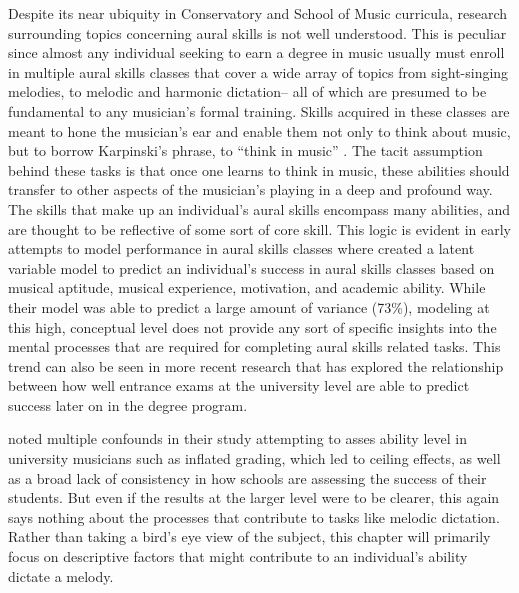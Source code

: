 \documentclass[12pt,]{book}
\begin{document}
Despite its near ubiquity in Conservatory and School of Music curricula, research surrounding topics concerning aural skills is not well understood.
This is peculiar since almost any individual seeking to earn a degree in music usually must enroll in multiple aural skills classes that cover a wide array of topics from sight-singing melodies, to melodic and harmonic dictation-- all of which are presumed to be fundamental to any musician's formal training.
Skills acquired in these classes are meant to hone the musician's ear and enable them not only to think about music, but to borrow Karpinski's phrase, to ``think in music'' \citetext{\citealp[p.4]{karpinskiAuralSkillsAcquisition2000}; \citealp{bestMusicCurriculaFuture1992}}.
The tacit assumption behind these tasks is that once one learns to think in music, these abilities should transfer to other aspects of the musician's playing in a deep and profound way.
The skills that make up an individual's aural skills encompass many abilities, and are thought to be reflective of some sort of core skill.
This logic is evident in early attempts to model performance in aural skills classes where \citet{harrisonEffectsMusicalAptitude1994} created a latent variable model to predict an individual's success in aural skills classes based on musical aptitude, musical experience, motivation, and academic ability.
While their model was able to predict a large amount of variance (73\%), modeling at this high, conceptual level does not provide any sort of specific insights into the mental processes that are required for completing aural skills related tasks.
This trend can also be seen in more recent research that has explored the relationship between how well entrance exams at the university level are able to predict success later on in the degree program.

\citet{wolfGradesReflectDevelopment2014} noted multiple confounds in their study attempting to asses ability level in university musicians such as inflated grading, which led to ceiling effects, as well as a broad lack of consistency in how schools are assessing the success of their students.
But even if the results at the larger level were to be clearer, this again says nothing about the processes that contribute to tasks like melodic dictation.
Rather than taking a bird's eye view of the subject, this chapter will primarily focus on descriptive factors that might contribute to an individual's ability dictate a melody.
\end{document}
